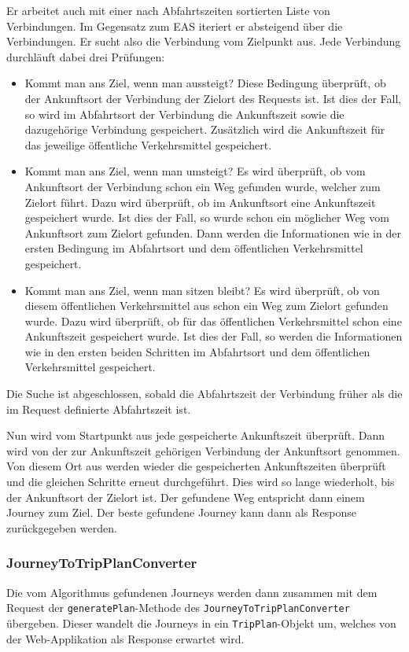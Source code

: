 Er arbeitet auch mit einer nach Abfahrtszeiten sortierten Liste von Verbindungen. Im Gegensatz zum EAS iteriert er absteigend über die Verbindungen. Er sucht also die Verbindung vom Zielpunkt aus. Jede Verbindung durchläuft dabei drei Prüfungen:

\begin{itemize}
	\item Kommt man ans Ziel, wenn man aussteigt?	\newline
	Diese Bedingung überprüft, ob der Ankunftsort der Verbindung der Zielort des Requests ist. Ist dies der Fall, so wird im Abfahrtsort der Verbindung die Ankunftszeit sowie die dazugehörige Verbindung gespeichert. Zusätzlich wird die Ankunftszeit für das jeweilige öffentliche Verkehrsmittel gespeichert.
	\item Kommt man ans Ziel, wenn man umsteigt? \newline
	Es wird überprüft, ob vom Ankunftsort der Verbindung schon ein Weg gefunden wurde, welcher zum Zielort führt. Dazu wird überprüft, ob im Ankunftsort eine Ankunftszeit gespeichert wurde. Ist dies der Fall, so wurde schon ein möglicher Weg vom Ankunftsort zum Zielort gefunden. Dann werden die Informationen wie in der ersten Bedingung im Abfahrtsort und dem öffentlichen Verkehrsmittel gespeichert.
	\item Kommt man ans Ziel, wenn man sitzen bleibt? \newline
	Es wird überprüft, ob von diesem öffentlichen Verkehrsmittel aus schon ein Weg zum Zielort gefunden wurde. Dazu wird überprüft, ob für das öffentlichen Verkehrsmittel schon eine Ankunftszeit gespeichert wurde. Ist dies der Fall, so werden die Informationen wie in den ersten beiden Schritten im Abfahrtsort und dem öffentlichen Verkehrsmittel gespeichert.
\end{itemize}
Die Suche ist abgeschlossen, sobald die Abfahrtszeit der Verbindung früher als die im Request definierte Abfahrtszeit ist. \newline

Nun wird vom Startpunkt aus jede gespeicherte Ankunftszeit überprüft. Dann wird von der zur Ankunftszeit gehörigen Verbindung der Ankunftsort genommen. Von diesem Ort aus werden wieder die gespeicherten Ankunftszeiten überprüft und die gleichen Schritte erneut durchgeführt. Dies wird so lange wiederholt, bis der Ankunftsort der Zielort ist. Der gefundene Weg entspricht dann einem Journey zum Ziel. Der beste gefundene Journey kann dann als Response zurückgegeben werden. 
\subsubsection{JourneyToTripPlanConverter}
Die vom \hypertarget{journeyToTripPlanConverter}{Algorithmus} gefundenen Journeys werden dann zusammen mit dem Request der \texttt{generatePlan}-Methode des \texttt{JourneyToTripPlanConverter} übergeben. Dieser wandelt die Journeys in ein \texttt{TripPlan}-Objekt um, welches von der Web-Applikation als Response erwartet wird. \newline

